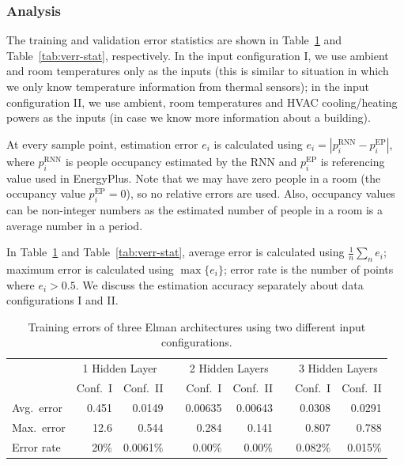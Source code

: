 \subsubsection{Analysis}
The training and validation error statistics are shown in
Table~\ref{tab:terr-stat} and Table~\ref{tab:verr-stat}, respectively.
In the input configuration I, we use ambient and room temperatures
only as the inputs (this is similar to situation in which we only know
temperature information from thermal sensors); in the input
configuration II, we use ambient, room temperatures and HVAC
cooling/heating powers as the inputs (in case we know more information
about a building).

At every sample point, estimation error $e_i$ is calculated using
$e_i=\left|p_i^{\text{RNN}}-p_i^{\text{EP}}\right|$, where
$p_i^{\text{RNN}}$ is people occupancy estimated by the RNN and
$p_i^{\text{EP}}$ is referencing value used in EnergyPlus. Note that we may
have zero people in a room (the occupancy value $p_i^\text{EP} = 0$), so
no relative errors are used. Also, occupancy values can be
non-integer numbers as the estimated number of people in a room is a
average number in a period.

In Table~\ref{tab:terr-stat} and Table~\ref{tab:verr-stat}, average
error is calculated using $\frac1n\sum_ne_i$; maximum error is
calculated using $\max\{e_i\}$; error rate is the number of points
where $e_i>0.5$. We discuss the estimation accuracy separately about
data configurations I and II.

\begin{table}[t]
    \centering
    \begingroup
    \setlength{\tabcolsep}{3.6pt} 
    \begin{tabular}{lrrcrrcrr}
        \toprule
        & \multicolumn{2}{c}{1 Hidden Layer} && \multicolumn{2}{c}{2 Hidden Layers} && \multicolumn{2}{c}{3 Hidden Layers}\\
        \cmidrule{2-3} \cmidrule{5-6} \cmidrule{8-9}
        & Conf.~I & Conf.~II && Conf.~I & Conf.~II && Conf.~I & Conf.~II\\
        \midrule
        Avg.~error & 0.451      & 0.0149    && 0.00635   & 0.00643   && 0.0308      & 0.0291    \\
        Max.~error & 12.6       & 0.544     && 0.284     & 0.141     && 0.807       & 0.788     \\
        Error rate & 20\%       & 0.0061\%  && 0.00\%    & 0.00\%    && 0.082\%     & 0.015\%   \\
        \bottomrule
    \end{tabular}
    \endgroup
    \caption{Training errors of three Elman architectures using two
        different input configurations.}
    \label{tab:terr-stat}
\end{table}

